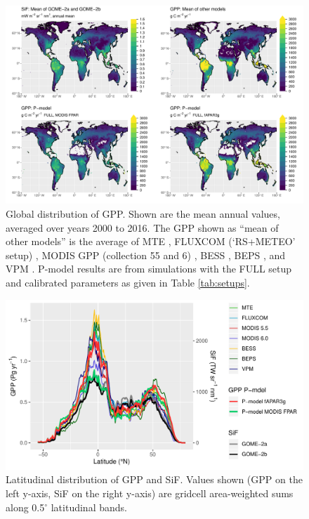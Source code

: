 \documentclass[gmd, manuscript]{copernicus}
\begin{document}
 \begin{figure}[!ht]
\includegraphics[width=\textwidth]{fig/maps_comparison.pdf}
\caption{Global distribution of GPP. Shown are the mean annual values, averaged over years 2000 to 2016. The GPP shown as ``mean of other models'' is the average of MTE \citep{jung11jgr}, FLUXCOM (`RS+METEO' setup) \citep{tramontana16bg}, MODIS GPP (collection 55 and 6) \citep{running04, zhao05}, BESS \citep{jiang16rse}, BEPS \citep{he18grl, chen16agrformet}, and VPM \citep{zhang17scidat}. P-model results are from simulations with the FULL setup and calibrated parameters as given in Table \ref{tab:setups}.}
    \label{fig:gpp_global}
\end{figure}


 \begin{figure}[t]
\includegraphics[width=12cm]{fig/gpp_by_latitude.pdf}
    \caption{Latitudinal distribution of GPP and SiF. Values shown (GPP on the left y-axis, SiF on the right y-axis) are gridcell area-weighted sums along 0.5$^{\circ}$ latitudinal bands.}
    \label{fig:gpp_by_lat}  
\end{figure}
\end{document}
